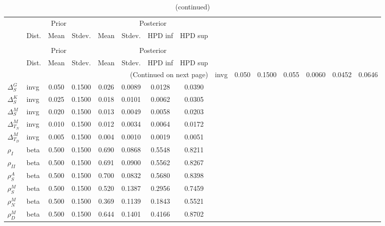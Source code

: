  
\begin{center}
\begin{longtable}{llcccccc} 
\caption{Results from Metropolis-Hastings (parameters)}
 \label{Table:MHPosterior:1}\\
\toprule 
  & \multicolumn{3}{c}{Prior}  &  \multicolumn{4}{c}{Posterior} \\
  \cmidrule(r{.75em}){2-4} \cmidrule(r{.75em}){5-8}
  & Dist. & Mean  & Stdev. & Mean & Stdev. & HPD inf & HPD sup\\
\midrule \endfirsthead 
\caption{(continued)}\\\toprule 
  & \multicolumn{3}{c}{Prior}  &  \multicolumn{4}{c}{Posterior} \\
  \cmidrule(r{.75em}){2-4} \cmidrule(r{.75em}){5-8}
  & Dist. & Mean  & Stdev. & Mean & Stdev. & HPD inf & HPD sup\\
\midrule \endhead 
\bottomrule \multicolumn{8}{r}{(Continued on next page)} \endfoot 
\bottomrule \endlastfoot 
${\Delta^{A}_{S}}$ & invg &   0.050 & 0.1500 &   0.055& 0.0060 &  0.0452 &  0.0646 \\ 
${\Delta^{G}_{S}}$ & invg &   0.050 & 0.1500 &   0.026& 0.0089 &  0.0128 &  0.0390 \\ 
${\Delta^{K}_{S}}$ & invg &   0.025 & 0.1500 &   0.018& 0.0101 &  0.0062 &  0.0305 \\ 
${\Delta^{M}_{S}}$ & invg &   0.020 & 0.1500 &   0.013& 0.0049 &  0.0058 &  0.0203 \\ 
${\Delta^{M}_{T_N}}$ & invg &   0.010 & 0.1500 &   0.012& 0.0034 &  0.0064 &  0.0172 \\ 
${\Delta^{M}_{T_D}}$ & invg &   0.005 & 0.1500 &   0.004& 0.0010 &  0.0019 &  0.0051 \\ 
${\rho_{I}}$ & beta &   0.500 & 0.1500 &   0.690& 0.0868 &  0.5548 &  0.8211 \\ 
${\rho_{II}}$ & beta &   0.500 & 0.1500 &   0.691& 0.0900 &  0.5562 &  0.8267 \\ 
${\rho^{A}_{S}}$ & beta &   0.500 & 0.1500 &   0.700& 0.0832 &  0.5680 &  0.8398 \\ 
${\rho^{M}_{S}}$ & beta &   0.500 & 0.1500 &   0.520& 0.1387 &  0.2956 &  0.7459 \\ 
${\rho^{M}_{N}}$ & beta &   0.500 & 0.1500 &   0.369& 0.1139 &  0.1843 &  0.5521 \\ 
${\rho^{M}_{D}}$ & beta &   0.500 & 0.1500 &   0.644& 0.1401 &  0.4166 &  0.8702 \\ 
\end{longtable}
 \end{center}
